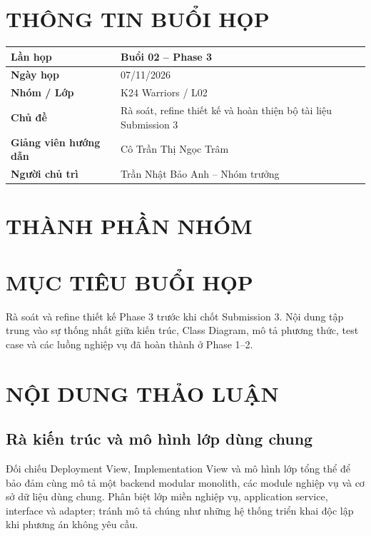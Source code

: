 \documentclass[10pt,a4paper]{article}
\begin{document}
\MakeHCMUTCover
{}
\section{THÔNG TIN BUỔI HỌP}
\begin{center}
\begin{tabularx}{\textwidth}{|>{\bfseries}L{43mm}|Y|}
\hline
Lần họp & Buổi 02 -- Phase 3\\\hline
Ngày họp & 07/11/2026\\\hline
Nhóm / Lớp & K24 Warriors / L02\\\hline
Chủ đề & Rà soát, refine thiết kế và hoàn thiện bộ tài liệu Submission 3\\\hline
Giảng viên hướng dẫn & Cô Trần Thị Ngọc Trâm\\\hline
Người chủ trì & Trần Nhật Bảo Anh -- Nhóm trưởng\\\hline
\end{tabularx}
\end{center}
\section{THÀNH PHẦN NHÓM}
\begin{HCMUTMemberTable}
\end{HCMUTMemberTable}
\section{MỤC TIÊU BUỔI HỌP}
Rà soát và refine thiết kế Phase 3 trước khi chốt Submission 3. Nội dung tập trung vào sự thống nhất giữa kiến trúc, Class Diagram, mô tả phương thức, test case và các luồng nghiệp vụ đã hoàn thành ở Phase 1--2.

\section{NỘI DUNG THẢO LUẬN}
\subsection{Rà kiến trúc và mô hình lớp dùng chung}
Đối chiếu Deployment View, Implementation View và mô hình lớp tổng thể để bảo đảm cùng mô tả một backend modular monolith, các module nghiệp vụ và cơ sở dữ liệu dùng chung. Phân biệt lớp miền nghiệp vụ, application service, interface và adapter; tránh mô tả chúng như những hệ thống triển khai độc lập khi phương án không yêu cầu.
\end{document}
